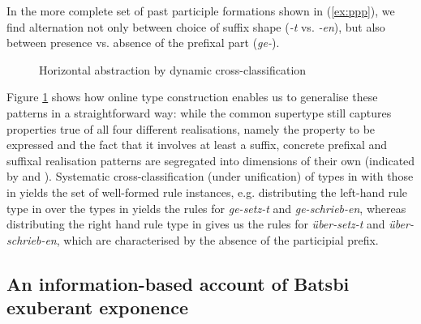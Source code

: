 \documentclass[output=paper]{langsci/langscibook}
\begin{document}
In the more complete set of past participle formations shown in
(\ref{ex:ppp}), we find alternation not only between choice of suffix
shape (\textit{-t} vs. \textit{-en}), but also between presence
vs. absence of the prefixal part (\textit{ge-}).

\begin{figure}

  \caption{Horizontal abstraction by dynamic cross-classification\label{fig:Horizontal}}
\end{figure}

Figure \ref{fig:Horizontal} shows how online type construction enables
us to generalise these patterns in a straightforward way: while the
common supertype still captures properties true of all four different
realisations, namely the property to be expressed and the fact that it
involves at least a suffix, concrete prefixal and suffixal realisation
patterns are segregated into dimensions of their own (indicated by
 and ). Systematic cross-classification
(under unification) of types in  with those in
 yields the set of well-formed rule instances,
e.g. distributing the left-hand rule type in   over the types
in  yields the rules for \textit{ge-setz-t} and
\textit{ge-schrieb-en}, whereas distributing the right hand rule type in
 gives us the rules for \textit{über-setz-t} and
\textit{über-schrieb-en}, which are characterised by the absence of
the participial prefix.

\subsection{An information-based account of Batsbi exuberant exponence }
\label{sec:IbM:Batsbi}
\end{document}
